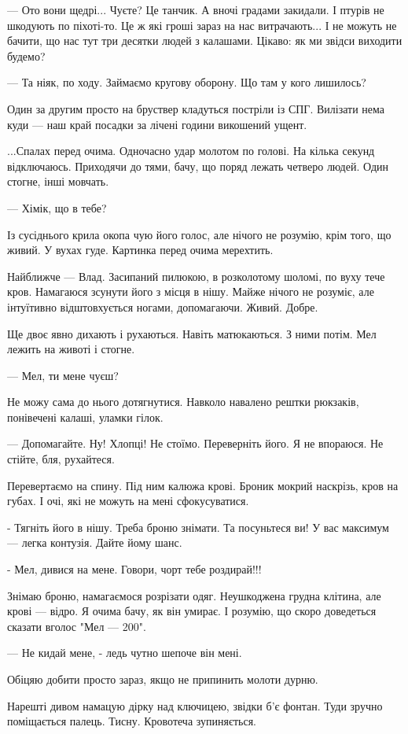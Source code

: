 — Ото вони щедрі... Чуєте? Це танчик. А вночі градами закидали. І птурів не
шкодують по піхоті-то.  Це ж які гроші зараз на нас витрачають... І не можуть
не бачити, що нас тут три десятки людей з калашами. Цікаво: як ми звідси
виходити будемо? 

— Та ніяк, по ходу. Займаємо кругову оборону. Що там у кого лишилось? 

Один за другим просто на бруствер кладуться постріли із СПГ.  Вилізати нема
куди — наш край посадки за лічені години викошений ущент.

...Спалах перед очима. Одночасно удар молотом по голові. На кілька секунд
відключаюсь. Приходячи до тями, бачу, що поряд лежать четверо людей. Один
стогне, інші мовчать. 

— Хімік, що в тебе?

Із сусіднього крила окопа чую його голос, але нічого не розумію, крім того, що
живий. У вухах гуде. Картинка перед очима мерехтить. 

Найближче  —     Влад. Засипаний пилюкою, в розколотому шоломі, по вуху тече
кров. Намагаюся зсунути його з місця в нішу. Майже нічого не розуміє, але
інтуїтивно відштовхується ногами, допомагаючи. Живий. Добре.

Ще двоє явно дихають і рухаються. Навіть матюкаються. З ними потім. Мел лежить
на животі і стогне. 

— Мел, ти мене чуєш? 

Не можу сама до нього дотягнутися. Навколо навалено рештки рюкзаків, понівечені
калаші, уламки гілок. 

— Допомагайте. Ну! Хлопці! Не стоїмо. Переверніть його. Я не впораюся. Не
стійте, бля, рухайтеся. 

Перевертаємо на спину. Під ним калюжа крові. Броник мокрий наскрізь, кров на
губах. І очі, які не можуть на мені сфокусуватися. 

- Тягніть  його в нішу. Треба броню знімати. Та посуньтеся ви! У вас максимум —
легка контузія. Дайте йому шанс. 

- Мел, дивися на мене. Говори, чорт тебе роздирай!!!

Знімаю броню, намагаємося розрізати одяг. Неушкоджена грудна клітина, але крові
— відро. Я очима бачу, як він умирає. І розумію, що скоро доведеться сказати
вголос "Мел — 200".  

— Не кидай мене,  - ледь чутно шепоче він мені. 

Обіцяю добити просто зараз, якщо не припинить молоти дурню. 

Нарешті дивом намацую дірку над ключицею, звідки б'є фонтан. Туди зручно
поміщається палець. Тисну. Кровотеча зупиняється. 

